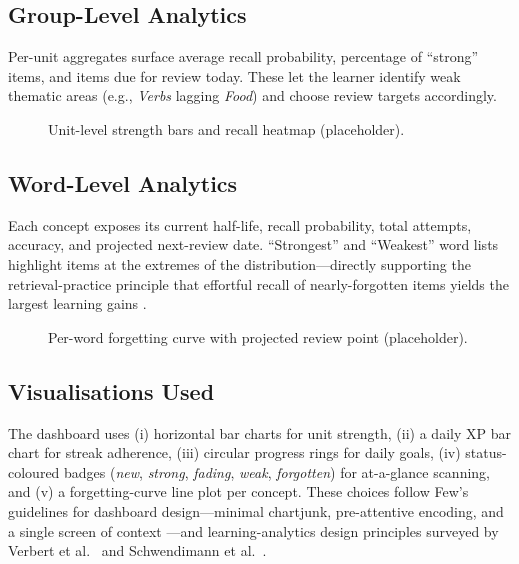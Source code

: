 \documentclass[11pt,a4paper]{article}
\begin{document}
\subsection{Group-Level Analytics}
Per-unit aggregates surface average recall probability, percentage of ``strong'' items, and items due for review today. These let the learner identify weak thematic areas (e.g., \emph{Verbs} lagging \emph{Food}) and choose review targets accordingly.

\begin{figure}[H]
  \centering
  \fbox{\rule{0pt}{4.5cm}\rule{11cm}{0pt}}
  \caption{Unit-level strength bars and recall heatmap (placeholder).}
  \label{fig:group-analytics}
\end{figure}

\subsection{Word-Level Analytics}
Each concept exposes its current half-life, recall probability, total attempts, accuracy, and projected next-review date. ``Strongest'' and ``Weakest'' word lists highlight items at the extremes of the distribution—directly supporting the retrieval-practice principle that effortful recall of nearly-forgotten items yields the largest learning gains \cite{karpicke2008critical}.

\begin{figure}[H]
  \centering
  \fbox{\rule{0pt}{4cm}\rule{11cm}{0pt}}
  \caption{Per-word forgetting curve with projected review point (placeholder).}
  \label{fig:word-curve}
\end{figure}

\subsection{Visualisations Used}
The dashboard uses (i) horizontal bar charts for unit strength, (ii) a daily XP bar chart for streak adherence, (iii) circular progress rings for daily goals, (iv) status-coloured badges (\emph{new}, \emph{strong}, \emph{fading}, \emph{weak}, \emph{forgotten}) for at-a-glance scanning, and (v) a forgetting-curve line plot per concept. These choices follow Few's guidelines for dashboard design—minimal chartjunk, pre-attentive encoding, and a single screen of context \cite{few2006information}—and learning-analytics design principles surveyed by Verbert et al.\ \cite{verbert2014learning} and Schwendimann et al.\ \cite{schwendimann2017perceiving}.
\end{document}
